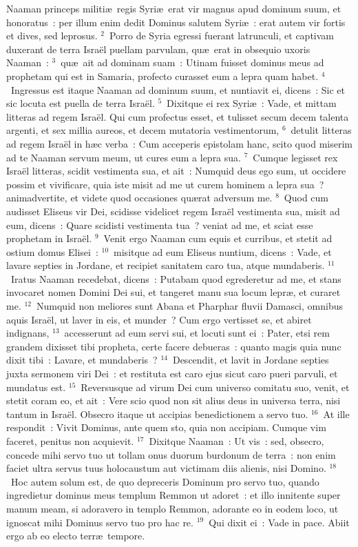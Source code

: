 \lettrine[lines=10,image=true,loversize=0.05,lraise=-0.03]{N}{}aaman princeps militi\ae\ regis Syri\ae\ erat vir magnus apud dominum suum, et honoratus~: per illum enim dedit Dominus salutem Syri\ae~: erat autem vir fortis et dives, sed leprosus.
${}^{2}$~Porro de Syria egressi fuerant latrunculi, et captivam duxerant de terra Isra\"el puellam parvulam, qu\ae\ erat in obsequio uxoris Naaman~:
${}^{3}$~qu\ae\ ait ad dominam suam~: Utinam fuisset dominus meus ad prophetam qui est in Samaria, profecto curasset eum a lepra quam habet.
${}^{4}$~Ingressus est itaque Naaman ad dominum suum, et nuntiavit ei, dicens~: Sic et sic locuta est puella de terra Isra\"el.
${}^{5}$~Dixitque ei rex Syri\ae~: Vade, et mittam litteras ad regem Isra\"el. Qui cum profectus esset, et tulisset secum decem talenta argenti, et sex millia aureos, et decem mutatoria vestimentorum,
${}^{6}$~detulit litteras ad regem Isra\"el in h\ae c verba~: Cum acceperis epistolam hanc, scito quod miserim ad te Naaman servum meum, ut cures eum a lepra sua.
${}^{7}$~Cumque legisset rex Isra\"el litteras, scidit vestimenta sua, et ait~: Numquid deus ego sum, ut occidere possim et vivificare, quia iste misit ad me ut curem hominem a lepra sua~? animadvertite, et videte quod occasiones qu\ae rat adversum me.
${}^{8}$~Quod cum audisset Eliseus vir Dei, scidisse videlicet regem Isra\"el vestimenta sua, misit ad eum, dicens~: Quare scidisti vestimenta tua~? veniat ad me, et sciat esse prophetam in Isra\"el.
${}^{9}$~Venit ergo Naaman cum equis et curribus, et stetit ad ostium domus Elisei~:
${}^{10}$~misitque ad eum Eliseus nuntium, dicens~: Vade, et lavare septies in Jordane, et recipiet sanitatem caro tua, atque mundaberis.
${}^{11}$~Iratus Naaman recedebat, dicens~: Putabam quod egrederetur ad me, et stans invocaret nomen Domini Dei sui, et tangeret manu sua locum lepr\ae , et curaret me.
${}^{12}$~Numquid non meliores sunt Abana et Pharphar fluvii Damasci, omnibus aquis Isra\"el, ut laver in eis, et munder~? Cum ergo vertisset se, et abiret indignans,
${}^{13}$~accesserunt ad eum servi sui, et locuti sunt ei~: Pater, etsi rem grandem dixisset tibi propheta, certe facere debueras~: quanto magis quia nunc dixit tibi~: Lavare, et mundaberis~?
${}^{14}$~Descendit, et lavit in Jordane septies juxta sermonem viri Dei~: et restituta est caro ejus sicut caro pueri parvuli, et mundatus est.
${}^{15}$~Reversusque ad virum Dei cum universo comitatu suo, venit, et stetit coram eo, et ait~: Vere scio quod non sit alius deus in universa terra, nisi tantum in Isra\"el. Obsecro itaque ut accipias benedictionem a servo tuo.
${}^{16}$~At ille respondit~: Vivit Dominus, ante quem sto, quia non accipiam. Cumque vim faceret, penitus non acquievit.
${}^{17}$~Dixitque Naaman~: Ut vis~: sed, obsecro, concede mihi servo tuo ut tollam onus duorum burdonum de terra~: non enim faciet ultra servus tuus holocaustum aut victimam diis alienis, nisi Domino.
${}^{18}$~Hoc autem solum est, de quo depreceris Dominum pro servo tuo, quando ingredietur dominus meus templum Remmon ut adoret~: et illo innitente super manum meam, si adoravero in templo Remmon, adorante eo in eodem loco, ut ignoscat mihi Dominus servo tuo pro hac re.
${}^{19}$~Qui dixit ei~: Vade in pace. Abiit ergo ab eo electo terr\ae\ tempore.


